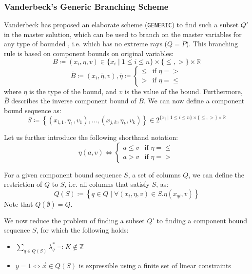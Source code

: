 \subsubsection{Vanderbeck's Generic Branching Scheme}\label{sec:cg_bp_bp_branching_generic}
Vanderbeck has proposed an elaborate scheme (\texttt{GENERIC}) to find such a subset $Q'$ in the master solution, which can be used to branch on the master variables for any type of bounded \IP{}, i.e. which has no extreme rays ($Q = \ddot{P}$). This branching rule is based on component bounds on original variables:
\begin{equation}
B \coloneqq \left( x_i, \eta, v \right) \in \{x_i \mid 1 \leq i \leq n\} \times \{\leq, >\} \times \mathbb{R}
\end{equation}
\begin{equation}
\bar{B} \coloneqq \left( x_i, \bar{\eta}, v \right), \bar{\eta} \coloneqq \begin{cases} \leq & \text{if } \eta = > \\ > & \text{if } \eta = \leq \end{cases}
\end{equation}
where $\eta$ is the type of the bound, and $v$ is the value of the bound. Furthermore, $\bar{B}$ describes the inverse component bound of $B$. We can now define a component bound sequence as:
\begin{equation}
S \coloneqq \left\{ \left( x_{i,1}, \eta_1, v_1 \right), \dots, \left( x_{j,k}, \eta_k, v_k \right) \right\} \in 2^{\{x_i \mid 1 \leq i \leq n\} \times \{\leq, >\} \times \mathbb{R}}
\end{equation}

Let us further introduce the following shorthand notation:
\begin{equation}
\eta(a, v) \Leftrightarrow
\begin{cases}
a \leq v & \text{if } \eta = \leq \\
a > v & \text{if } \eta = >
\end{cases}
\end{equation}

For a given component bound sequence $S$, a set of columns $Q$, we can define the restriction of $Q$ to $S$, i.e. all columns that satisfy $S$, as:
\begin{equation}
Q(S) \coloneqq \left\{ q \in Q \mid \forall \left( x_i, \eta, v \right) \in S. \eta(x_{qi}, v) \right\}
\end{equation}
Note that $Q(\emptyset) = Q$.

We now reduce the problem of finding a subset $Q'$ to finding a component bound sequence $S$, for which the following holds:
\begin{itemize}
\item $\sum_{q \in Q(S)} \lambda_q^* \eqqcolon K \not\in \mathbb{Z}$
\item $y = 1 \Leftrightarrow \vec{x} \in Q(S)$ is expressible using a finite set of linear constraints
\end{itemize}


